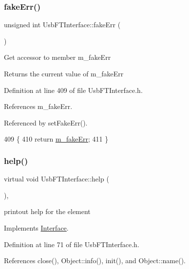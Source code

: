 \subsubsection{\texorpdfstring{fake\+Err()}{fakeErr()}}
{\footnotesize\ttfamily unsigned int Usb\+F\+T\+Interface\+::fake\+Err (\begin{DoxyParamCaption}{ }\end{DoxyParamCaption})\hspace{0.3cm}{\ttfamily [inline]}}

Get accessor to member m\+\_\+fake\+Err \begin{DoxyReturn}{Returns}
the current value of m\+\_\+fake\+Err 
\end{DoxyReturn}


Definition at line 409 of file Usb\+F\+T\+Interface.\+h.



References m\+\_\+fake\+Err.



Referenced by set\+Fake\+Err().


\begin{DoxyCode}
409                           \{
410     \textcolor{keywordflow}{return} \hyperlink{classUsbFTInterface_ab3660cba031df164b2d2df6e4c40f291}{m\_fakeErr};
411   \}
\end{DoxyCode}
\mbox{\label{classUsbFTInterface_a91a0046390c76ca8abaa330fa244279c}} 
\subsubsection{\texorpdfstring{help()}{help()}}
{\footnotesize\ttfamily virtual void Usb\+F\+T\+Interface\+::help (\begin{DoxyParamCaption}{ }\end{DoxyParamCaption})\hspace{0.3cm}{\ttfamily [inline]}, {\ttfamily [virtual]}}

printout help for the element 

Implements \hyperlink{classInterface_aedd3cf1d964c837e7848ccf81dc9c760}{Interface}.



Definition at line 71 of file Usb\+F\+T\+Interface.\+h.



References close(), Object\+::info(), init(), and Object\+::name().


